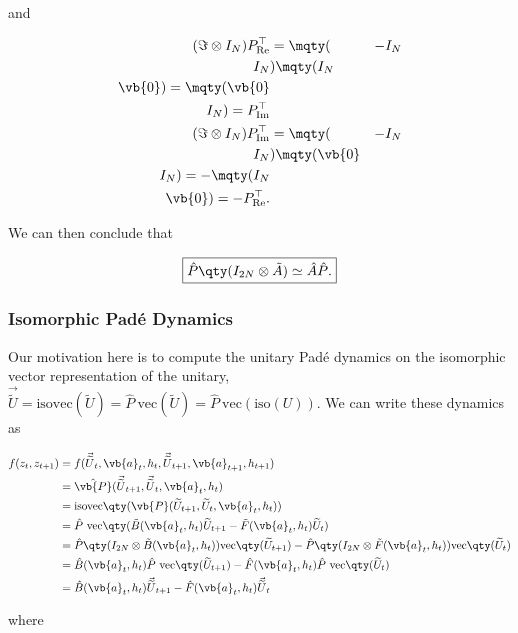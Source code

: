 \documentclass{article}
\newcommand{\isoU}{\widetilde{U}}
\newcommand{\isovecU}{\vec{\widetilde{U}}}
\newcommand{\isovec}{\text{isovec}}
\newcommand{\Pre}{P_{\text{Re}}}
\newcommand{\Pim}{P_{\text{Im}}}
\begin{document}
\noindent
and

\begin{align*}
  (\Im \otimes I_N)\Pre^\top &= \mqty(& -I_N \\ I_N &) \mqty(I_N \\ \vb{0}) = \mqty(\vb{0} \\ I_N) = \Pim^\top \\ 
  (\Im \otimes I_N)\Pim^\top &= \mqty(& -I_N \\ I_N &) \mqty(\vb{0} \\ I_N) = -\mqty(I_N \\ \vb{0}) = -\Pre^\top.
\end{align*}

\noindent
We can then conclude that

\begin{align*}
  \boxed{\hat P \qty(I_{2N} \otimes \tilde A) \simeq \hat A \hat P.}
\end{align*}

\newpage
\subsubsection*{Isomorphic Pad\'e Dynamics}
Our motivation here is to compute the unitary Pad\'e dynamics on the isomorphic vector representation of the unitary, $\isovecU = \isovec(\isoU) = \hat P \ \text{vec}(\isoU) = \hat P \ \text{vec}(\text{iso}(U))$. We can write these dynamics as

\begin{align*}
  f(z_t, z_{t+1}) &= f(\isovecU_t, \vb{a}_t, h_t, \isovecU_{t+1}, \vb{a}_{t+1}, h_{t+1}) \\
  &= \hat{\vb{P}}(\isovecU_{t+1}, \isovecU_t, \vb{a}_t, h_t) \\
  &= \isovec\qty(\vb{P}(\isoU_{t+1}, \isoU_t, \vb{a}_t, h_t)) \\
  &= \hat P \ \text{vec}\qty(\tilde B(\vb{a}_t, h_t) \isoU_{t+1} - \tilde F(\vb{a}_t, h_t) \isoU_t) \\
  &= \hat P \qty(I_{2N} \otimes \tilde B(\vb{a}_t, h_t)) \text{vec}\qty(\isoU_{t+1}) - \hat P \qty(I_{2N} \otimes \tilde F(\vb{a}_t, h_t)) \text{vec}\qty(\isoU_t) \\
  &= \hat B(\vb{a}_t, h_t) \hat P \ \text{vec}\qty(\isoU_{t+1})  - \hat F(\vb{a}_t, h_t) \hat P \ \text{vec}\qty(\isoU_t) \\
  &= \hat B(\vb{a}_t, h_t) \isovecU_{t+1} - \hat F(\vb{a}_t, h_t) \isovecU_t
\end{align*}

\noindent
where
\end{document}
